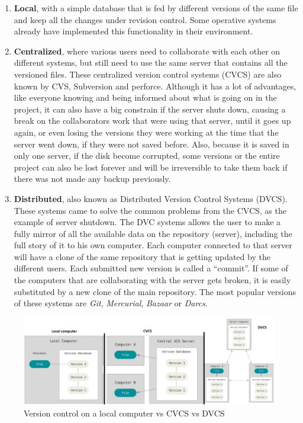\documentclass[mim_thesis.tex]{subfiles}
\begin{document}
\begin{enumerate}
\item \textbf{Local}, with a simple database that is fed by different versions of the same file and keep all the changes under revision control. Some operative systems already have implemented this functionality in their environment. 
\item \textbf{Centralized}, where various users need to collaborate with each other on different systems, but still need to use the same server that contains all the versioned files. These centralized version control systems (CVCS) are also known by CVS, Subversion and perforce. Although it has a lot of advantages, like everyone knowing and being informed about what is going on in the project, it can also have a big constrain if the server shuts down, causing a break on the collaborators work that were using that server, until it goes up again, or even losing the versions they were working at the time that the server went down, if they were not saved before. Also, because it is saved in only one server, if the disk become corrupted, some versions or the entire project can also be lost forever and will be irreversible to take them back if there was not made any backup previously.
\item \textbf{Distributed}, also known as Distributed Version Control Systems (DVCS). These systems came to solve the common problems from the CVCS, as the example of server shutdown. The DVC systems allows the user to make a fully mirror of all the available data on the repository (server), including the full story of it to his own computer. Each computer connected to that server will have a clone of the same repository that is getting updated by the different users. Each submitted new version is called a “commit”. If some of the computers that are collaborating with the server gets broken, it is easily substituted by a new clone of the main repository. The most popular versions of these systems are \textit{Git}, \textit{Mercurial}, \textit{Bazaar} or \textit{Darcs}. 
\end{enumerate}
    
\begin{figure}[H]
	\centering
    \includegraphics[width=1\textwidth]{img/version_control_comp.PNG}
	\caption{Version control on a local computer vs CVCS vs DVCS \citep{chacon2014pro}}
	\label{fig:version_control_comp}
\end{figure}
\end{document}
